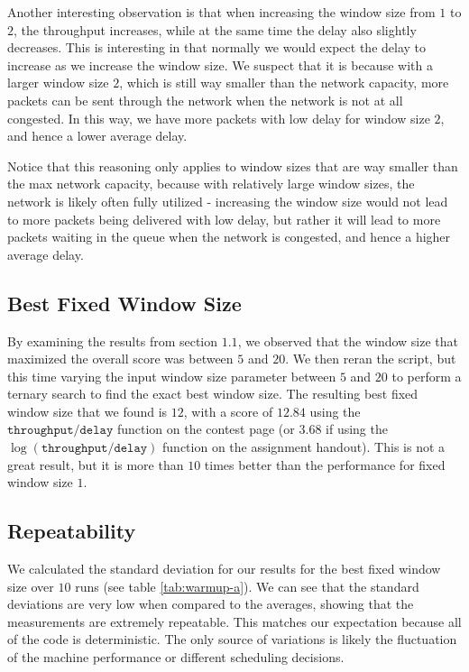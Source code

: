 \documentclass[11pt,a4paper]{article}
\begin{document}
Another interesting observation is that when increasing the window size
from $1$ to $2$, the throughput increases, while at the same time the delay also
slightly decreases. This is interesting in that normally we would expect the
delay to increase as we increase the window size. We suspect that it is because
with a
larger window size $2$, which is still way smaller than the network capacity, more
packets can be sent through the network when the network is not at all
congested. In this way, we have more packets with low delay for window size $2$,
and hence a lower average delay.

Notice that this reasoning only applies
to window sizes that are way smaller than the max network capacity, because with
relatively large window sizes, the network is likely often fully utilized -
increasing the window size would not lead to more packets being delivered with
low delay, but rather it will lead to more packets waiting in the queue when the
network is congested, and hence a higher average delay.

\subsection{Best Fixed Window Size}
By examining the
results from section $1.1$, we observed that the window size that maximized the
overall score was between $5$
and $20$. 
We then reran the script, but this time varying the input window size
parameter between $5$ and 
$20$ to perform a ternary search to find the exact best window
size. The resulting best fixed window size that we found is $12$, with a score of
$12.84$ using the $\texttt{throughput}/\texttt{delay}$ function on the contest page (or
$3.68$ if using the $\log(\texttt{throughput}/\texttt{delay})$  function on the assignment
handout).
This is not a great result, but it is more than $10$ times better than
the performance for fixed window size $1$.

\subsection{Repeatability}

We calculated the standard deviation for our results for the best fixed window
size over $10$ runs (see table \ref{tab:warmup-a}). We can see that the standard
deviations are very low when compared to the averages, showing that the
measurements are extremely repeatable. This matches our expectation because
all of the code is deterministic. The only source of variations is likely the
fluctuation of the machine performance or different scheduling decisions.
\end{document}
